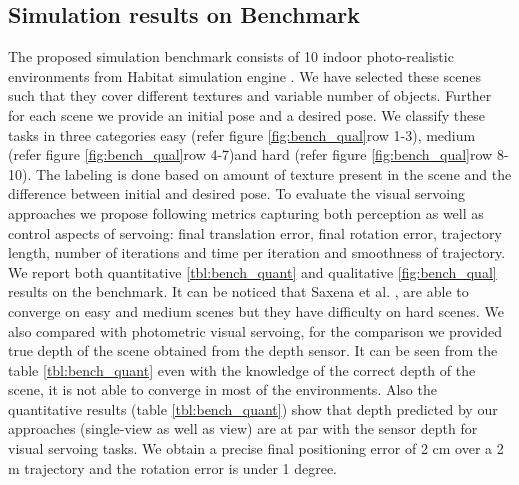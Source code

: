\documentclass[letterpaper, 10 pt, conference]{ieeeconf}  %
\begin{document}
\subsection{Simulation results on Benchmark}
The proposed simulation benchmark consists of 10 indoor photo-realistic environments from Habitat simulation engine \cite{habitat}. We have selected these scenes such that they cover different textures and variable number of objects. Further for each scene we provide an initial pose and a desired pose. We classify these tasks in three categories easy (refer figure \ref{fig:bench_qual}row 1-3), medium (refer figure \ref{fig:bench_qual}row 4-7)and hard (refer figure \ref{fig:bench_qual}row 8-10). The labeling is done based on amount of texture present in the scene and the difference between initial and desired pose. To evaluate the visual servoing approaches we propose following metrics capturing both perception as well as control aspects of servoing: final translation error, final rotation error, trajectory length, number of iterations and  time per iteration and smoothness of trajectory. We report both quantitative \ref{tbl:bench_quant}  and qualitative \ref{fig:bench_qual} results on the benchmark. It can be noticed that Saxena et al. \cite{servonet}, are able to converge on easy and medium scenes but they have difficulty on hard scenes. We also compared with photometric visual servoing, for the comparison we provided true depth of the scene obtained from the depth sensor. It can be seen from the  table \ref{tbl:bench_quant} even with the knowledge of the correct depth of the scene, it is not able to converge in most of the environments. Also the quantitative results (table \ref{tbl:bench_quant}) show that depth predicted by our approaches (single-view as well as view) are at par with the sensor depth for visual servoing tasks. We obtain a precise final positioning error of 2 cm over a 2 m trajectory and the rotation error is under 1 degree.
\end{document}
